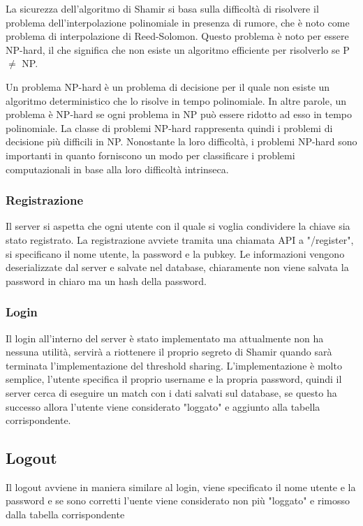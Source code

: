 La sicurezza dell'algoritmo di Shamir si basa sulla difficoltà di risolvere il problema dell'interpolazione polinomiale in presenza di rumore, che è noto come problema di interpolazione di Reed-Solomon. Questo problema è noto per essere NP-hard, il che significa che non esiste un algoritmo efficiente per risolverlo se P $\neq$ NP.

Un problema NP-hard è un problema di decisione per il quale non esiste un algoritmo deterministico che lo risolve in tempo polinomiale. In altre parole, un problema è NP-hard se ogni problema in NP può essere ridotto ad esso in tempo polinomiale. La classe di problemi NP-hard rappresenta quindi i problemi di decisione più difficili in NP. Nonostante la loro difficoltà, i problemi NP-hard sono importanti in quanto forniscono un modo per classificare i problemi computazionali in base alla loro difficoltà intrinseca.


\subsubsection{Registrazione}
Il server si aspetta che ogni utente con il quale si voglia condividere la chiave sia stato registrato. La registrazione avviete tramita una chiamata API a "/register", si specificano il nome utente, la password e la pubkey. Le informazioni vengono deserializzate dal server e salvate nel database, chiaramente non viene salvata la password in chiaro ma un hash della password.

\subsubsection{Login}
Il login all'interno del server è stato implementato ma attualmente non ha nessuna utilità, servirà a riottenere il proprio segreto di Shamir quando sarà terminata l'implementazione del threshold sharing. L'implementazione è molto semplice, l'utente specifica il proprio username e la propria password, quindi il server cerca di eseguire un match con i dati salvati sul database, se questo ha successo allora l'utente viene considerato "loggato" e aggiunto alla tabella corrispondente.

\subsection{Logout}
Il logout avviene in maniera similare al login, viene specificato il nome utente e la password e se sono corretti l'uente viene considerato non più "loggato" e rimosso dalla tabella corrispondente


